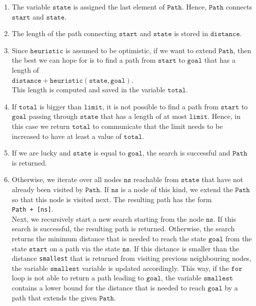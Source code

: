 \begin{enumerate}
\item The variable $\texttt{state}$ is assigned the last element of $\texttt{Path}$.  Hence, $\texttt{Path}$
      connects $\texttt{start}$ and $\texttt{state}$.
\item The length of the path connecting $\texttt{start}$ and $\texttt{state}$ is stored in 
      $\texttt{distance}$.
\item Since $\texttt{heuristic}$ is assumed to be optimistic,  if we want to extend $\texttt{Path}$, then the best we
      can hope for is to find a path from $\texttt{start}$ to $\texttt{goal}$ that has a length of
      \\[0.2cm]
      \hspace*{1.3cm}
      $\texttt{distance} + \texttt{heuristic}(\texttt{state}, \texttt{goal})$.
      \\[0.2cm]
      This length is computed and saved in the variable $\texttt{total}$.
\item If $\texttt{total}$ is bigger than $\texttt{limit}$, it is not possible to find a path from
      $\texttt{start}$ to $\texttt{goal}$ passing through $\texttt{state}$ that has a length of at most
      $\texttt{limit}$.  Hence, in this case we return $\texttt{total}$ to communicate that the limit needs to
      be increased to have at least a value of $\texttt{total}$.
\item If we are lucky and $\texttt{state}$ is equal to $\texttt{goal}$, the search is successful and $\texttt{Path}$ is returned.
\item Otherwise, we iterate over all nodes $\texttt{ns}$ reachable from $\texttt{state}$ that have not already been visited
      by $\texttt{Path}$.  If $\texttt{ns}$ is a node of this kind, we extend the $\texttt{Path}$ so that
      this node is visited next.  The resulting path has the form
      \\[0.2cm]
      \hspace*{1.3cm}
      \texttt{Path + [ns]}.
      \\[0.2cm]
      Next, we recursively start a new search starting from the node $\texttt{ns}$.  If this search is
      successful, the resulting path is returned.  Otherwise, the search returns the minimum distance that is
      needed to reach the state $\texttt{goal}$ from the state $\texttt{start}$ on a path via the state
      $\texttt{ns}$.  If this distance is smaller than the distance \texttt{smallest} that is returned from
      visiting previous neighbouring nodes, the variable $\texttt{smallest}$ variable is updated accordingly.
      This way, if the $\texttt{for}$ loop is not able to return a path leading to $\texttt{goal}$, the variable
      $\texttt{smallest}$ contains a lower bound for the distance that is needed to reach $\texttt{goal}$ by a path that
      extends the given $\texttt{Path}$. 


\end{enumerate}
